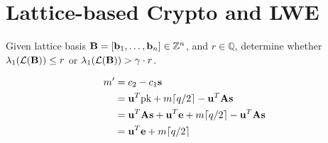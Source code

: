 \section{Lattice-based Crypto and LWE}
\label{sec:lattices}


Given lattice basis $\textbf{B} = [{{\bf b}}_1,\ldots,{{\bf b}}_n] \in \mathbb{Z}^n$,
and $r \in \mathbb{Q}$, determine whether $\lambda_1({\cal L}(\textbf{B})) \le r$
or $\lambda_1({\cal L}(\textbf{B})) > \gamma \cdot r$.


\begin{align*}
  m' &= c_2 - c_1\mathbf{s}\\
     &= \mathbf{u}^T\textnormal{pk} + m\lceil q/2\rceil -   \mathbf{u}^T\textbf{A}\mathbf{s} \\
     &= \mathbf{u}^T\textbf{A}\mathbf{s} + \mathbf{u}^T{{\bf e}} + m\lceil q/2\rceil -   \mathbf{u}^T\textbf{A}\mathbf{s} \\
     &= \mathbf{u}^T{{\bf e}} + m\lceil q/2\rceil
\end{align*}

